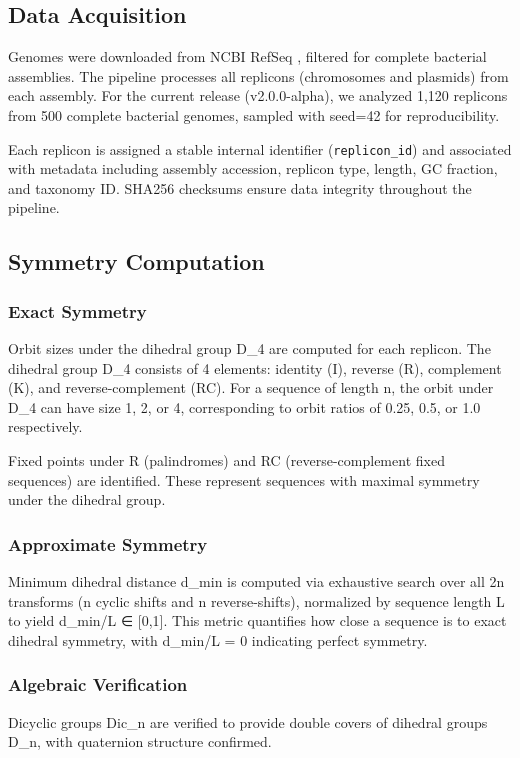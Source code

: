 \documentclass[12pt,a4paper]{article}
\begin{document}
\subsection{Data Acquisition}
Genomes were downloaded from NCBI RefSeq \cite{ncbi_refseq2023}, filtered for complete bacterial assemblies. The pipeline processes all replicons (chromosomes and plasmids) from each assembly. For the current release (v2.0.0-alpha), we analyzed 1,120 replicons from 500 complete bacterial genomes, sampled with seed=42 for reproducibility.

Each replicon is assigned a stable internal identifier (\texttt{replicon\_id}) and associated with metadata including assembly accession, replicon type, length, GC fraction, and taxonomy ID. SHA256 checksums ensure data integrity throughout the pipeline.

\subsection{Symmetry Computation}
\subsubsection{Exact Symmetry}
Orbit sizes under the dihedral group D\_4 are computed for each replicon. The dihedral group D\_4 consists of 4 elements: identity (I), reverse (R), complement (K), and reverse-complement (RC). For a sequence of length n, the orbit under D\_4 can have size 1, 2, or 4, corresponding to orbit ratios of 0.25, 0.5, or 1.0 respectively.

Fixed points under R (palindromes) and RC (reverse-complement fixed sequences) are identified. These represent sequences with maximal symmetry under the dihedral group.

\subsubsection{Approximate Symmetry}
Minimum dihedral distance d\_min is computed via exhaustive search over all 2n transforms (n cyclic shifts and n reverse-shifts), normalized by sequence length L to yield d\_min/L ∈ [0,1]. This metric quantifies how close a sequence is to exact dihedral symmetry, with d\_min/L = 0 indicating perfect symmetry.

\subsubsection{Algebraic Verification}
Dicyclic groups Dic\_n are verified to provide double covers of dihedral groups D\_n, with quaternion structure confirmed.
\end{document}
